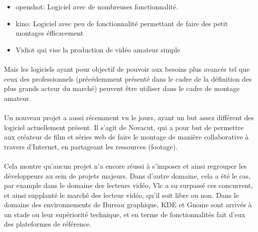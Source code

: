 \begin {itemize}

  \item {openshot: Logiciel avec de nombreuses fonctionnalité.}

  \item {kino: Logiciel avec peu de fonctionnalité permettant de faire des
    petit montages éfficacement}

  \item {Vidiot qui vise la production de vidéo amateur simple}

\end {itemize}

\paragraph {}

Mais les logiciels ayant pour objectif de pouvoir aux besoins plus
avancés tel que ceux des professionnels (précédemment présenté
dans le cadre de la définition des plus grands acteur du marché)
peuvent être utiliser dans le cadre de montage amateur.

\paragraph{}

Un nouveau projet a aussi récemment vu le jours, ayant un but assez
différent des logiciel actuellement présent. Il s'agit de Novacut,
qui a pour but de permettre aux créateur de film et séries web de
faire le montage de manière collaborative à travers d'Internet, en
partageant les ressources (footage).

\paragraph{}

Cela montre qu'aucun projet n'a encore réussi à s'imposer et ainsi
regrouper les développeurs au sein de projets majeurs. Dans d'autre
domaine, cela a été le cas, par example dans le domaine des lecteurs
vidéo, Vlc a su surpassé ces concurrent, et ainsi supplanté le
marché des lecteur vidéo, qu'il soit libre ou non. Dans le domaine
des environnements de Bureau graphique, KDE et Gnome sont arrivés à un
stade ou leur supériorité technique, et en terme de fonctionnalités
fait d'eux des plateformes de référence.

\paragraph{}


